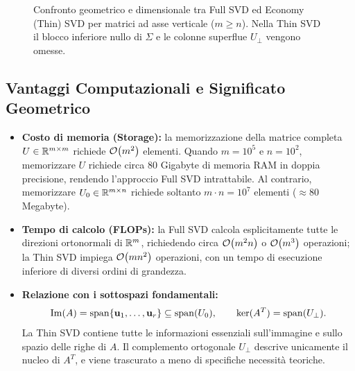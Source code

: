 \begin{figure}[H]
{
}
\caption{Confronto geometrico e dimensionale tra Full SVD ed Economy (Thin) SVD per matrici ad asse verticale ($m \ge n$). Nella Thin SVD il blocco inferiore nullo di $\Sigma$ e le colonne superflue $U_{\perp}$ vengono omesse.}
\label{fig:full-vs-thin-svd-structure}
\end{figure}

\subsection{Vantaggi Computazionali e Significato Geometrico}

\begin{itemize}
    \item \textbf{Costo di memoria (Storage):} la memorizzazione della matrice completa $U \in \mathbb{R}^{m \times m}$ richiede $\mathcal{O}\!\left(m^2\right)$ elementi. Quando $m = 10^5$ e $n = 10^2$, memorizzare $U$ richiede circa $80$ Gigabyte di memoria RAM in doppia precisione, rendendo l'approccio Full SVD intrattabile. Al contrario, memorizzare $U_0 \in \mathbb{R}^{m \times n}$ richiede soltanto $m \cdot n = 10^7$ elementi ($\approx 80$ Megabyte).
    \item \textbf{Tempo di calcolo (FLOPs):} la Full SVD calcola esplicitamente tutte le direzioni ortonormali di $\mathbb{R}^m$, richiedendo circa $\mathcal{O}\!\left(m^2 n\right)$ o $\mathcal{O}\!\left(m^3\right)$ operazioni; la Thin SVD impiega $\mathcal{O}\!\left(m n^2\right)$ operazioni, con un tempo di esecuzione inferiore di diversi ordini di grandezza.
    \item \textbf{Relazione con i sottospazi fondamentali:}
    \begin{equation}
        \operatorname{Im}(A) = \operatorname{span}\{\mathbf{u}_1, \dots, \mathbf{u}_r\} \subseteq \operatorname{span}(U_0), \qquad \ker(A^T) = \operatorname{span}(U_{\perp}).
    \end{equation}
    La Thin SVD contiene tutte le informazioni essenziali sull'immagine e sullo spazio delle righe di $A$. Il complemento ortogonale $U_{\perp}$ descrive unicamente il nucleo di $A^T$, e viene trascurato a meno di specifiche necessit\`a teoriche.
\end{itemize}

